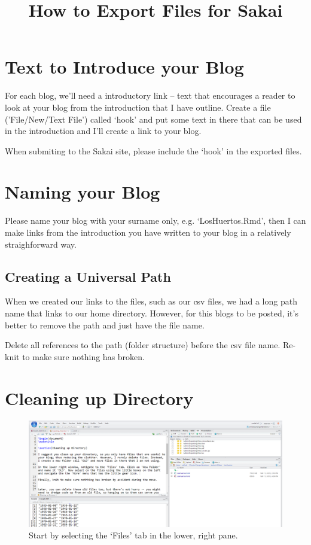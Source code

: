 \documentclass{article}\usepackage[]{graphicx}\usepackage[]{color}
\title{How to Export Files for Sakai}
\begin{document}
\maketitle

\section{Text to Introduce your Blog}

For each blog, we'll need a introductory link -- text that encourages a reader to look at your blog from the introduction that I have outline. Create a file ('File/New/Text File') called `hook' and put some text in there that can be used in the introduction and I'll create a link to your blog. 

When submiting to the Sakai site, please include the `hook' in the exported files.  

\section{Naming your Blog}

Please name your blog with your surname only, e.g. `LosHuertos.Rmd', then I can make links from the introduction you have written to your blog in a relatively straighforward way. 

\subsection{Creating a Universal Path}

When we created our links to the files, such as our csv files, we had a long path name that links to our home directory. However, for this blogs to be posted, it's better to remove the path and just have the file name. 

Delete all references to the path (folder structure) before the csv file name. Re-knit to make sure nothing has broken. 

\section{Cleaning up Directory}

\begin{figure}
\includegraphics[width=\textwidth]{FourWindows}
\caption{Start by selecting the `Files' tab in the lower, right pane.}
\end{figure}
\end{document}
